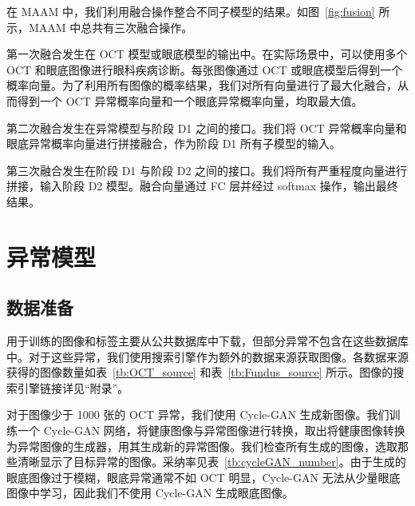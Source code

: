 \documentclass{article}
\begin{document}
	\begin{multicols}{2}
	
	在 MAAM 中，我们利用融合操作整合不同子模型的结果。如图~\ref{fig:fusion} 所示，MAAM 中总共有三次融合操作。
	
	第一次融合发生在 OCT 模型或眼底模型的输出中。在实际场景中，可以使用多个 OCT 和眼底图像进行眼科疾病诊断。每张图像通过 OCT 或眼底模型后得到一个概率向量。为了利用所有图像的概率结果，我们对所有向量进行了最大化融合，从而得到一个 OCT 异常概率向量和一个眼底异常概率向量，均取最大值。
	
	第二次融合发生在异常模型与阶段 D1 之间的接口。我们将 OCT 异常概率向量和眼底异常概率向量进行拼接融合，作为阶段 D1 所有子模型的输入。
	
	第三次融合发生在阶段 D1 与阶段 D2 之间的接口。我们将所有严重程度向量进行拼接，输入阶段 D2 模型。融合向量通过 FC 层并经过 softmax 操作，输出最终结果。
	
	\section{异常模型}
	
	\subsection{数据准备}
	
	用于训练的图像和标签主要从公共数据库中下载，但部分异常不包含在这些数据库中。对于这些异常，我们使用搜索引擎作为额外的数据来源获取图像。各数据来源获得的图像数量如表~\ref{tb:OCT_source} 和表~\ref{tb:Fundus_source} 所示。图像的搜索引擎链接详见“附录”。
	
	对于图像少于 1000 张的 OCT 异常，我们使用 Cycle-GAN \autocite{Zhu_Park_Isola_Efros_2020}生成新图像。我们训练一个 Cycle-GAN 网络，将健康图像与异常图像进行转换，取出将健康图像转换为异常图像的生成器，用其生成新的异常图像。我们检查所有生成的图像，选取那些清晰显示了目标异常的图像。采纳率见表~\ref{tb:cycleGAN_number}。由于生成的眼底图像过于模糊，眼底异常通常不如 OCT 明显，Cycle-GAN 无法从少量眼底图像中学习，因此我们不使用 Cycle-GAN 生成眼底图像。
	
	\end{multicols}
	
\end{document}
